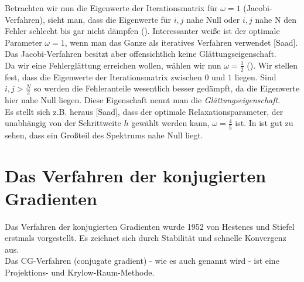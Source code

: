 \label{img.Jacobi2}

Betrachten wir nun die Eigenwerte der Iterationsmatrix für $\omega = 1$ (Jacobi-Verfahren), sieht man, dass die Eigenwerte für $i,j$ nahe Null oder $i,j$ nahe N den Fehler schlecht bis gar nicht dämpfen (). Interessanter weiße ist der optimale Parameter $\omega = 1$, wenn man das Ganze als iteratives Verfahren verwendet [Saad]. Das Jacobi-Verfahren besitzt aber offensichtlich keine Glättungseigenschaft.\\
Da wir eine Fehlerglättung erreichen wollen, wählen wir nun $\omega = \frac {1} {2}$ (). Wir stellen fest, dass die Eigenwerte der Iterationsmatrix zwischen $0$ und $1$ liegen. Sind $i,j > \frac {N} {2}$ so werden die Fehleranteile wesentlich besser gedämpft, da die Eigenwerte hier nahe Null liegen. Diese Eigenschaft nennt man die \textit{Glättungseigenschaft}.\\
Es stellt sich z.B. heraus [Saad], dass der optimale Relaxationsparameter, der unabhängig von der Schrittweite $h$ gewählt werden kann, $\omega = \frac {4} {5}$ ist. In  ist gut zu sehen, dass ein Großteil des Spektrums nahe Null liegt.

\label{img.Jacobi3}

\section{Das Verfahren der konjugierten Gradienten}\label{s.Das Verfahren der konjugierten Gradienten}

Das Verfahren der konjugierten Gradienten wurde 1952 von Hestenes und Stiefel erstmals vorgestellt. Es zeichnet sich durch Stabilität und schnelle Konvergenz aus. \\
Das CG-Verfahren (conjugate gradient) - wie es auch genannt wird - ist eine Projektions- und Krylow-Raum-Methode.

